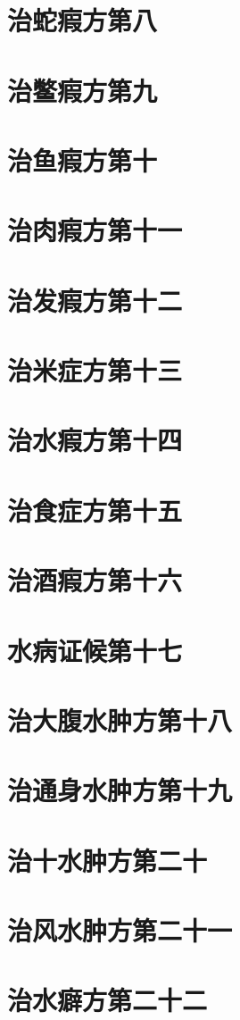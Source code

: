 \documentclass[a4paper,12pt,UTF8,twoside]{ctexbook}
\begin{document}
\chapter{治蛇瘕方第八}
\chapter{治鳖瘕方第九}
\chapter{治鱼瘕方第十}
\chapter{治肉瘕方第十一}
\chapter{治发瘕方第十二}
\chapter{治米症方第十三}
\chapter{治水瘕方第十四}
\chapter{治食症方第十五}
\chapter{治酒瘕方第十六}
\chapter{水病证候第十七}
\chapter{治大腹水肿方第十八}
\chapter{治通身水肿方第十九}
\chapter{治十水肿方第二十}
\chapter{治风水肿方第二十一}
\chapter{治水癖方第二十二}
\end{document}
